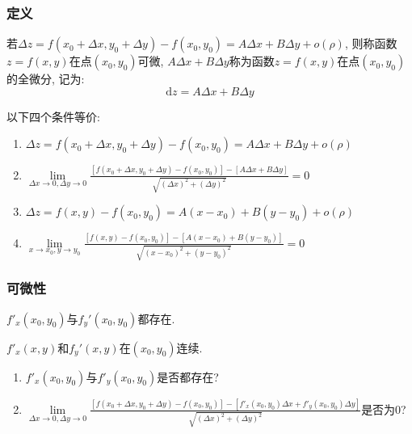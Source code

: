 \subsubsection{定义}
若$ \Delta z=f(x_{0}+\Delta x,y_{0}+\Delta y)-f(x_{0},y_{0})=A\Delta x+B\Delta y+o(\rho) $, 则称函数$ z=f(x,y) $在点$ (x_{0},y_{0}) $可微, $ A\Delta x+B\Delta y $称为函数$ z=f(x,y) $在点$ (x_{0},y_{0}) $的全微分, 记为:
\begin{equation*}
    \mathrm{d}z=A\Delta x+B\Delta y
\end{equation*}
\begin{tcolorbox}
    以下四个条件等价:
    \begin{enumerate}
        \item $ \Delta z=f(x_{0}+\Delta x,y_{0}+\Delta y)-f(x_{0},y_{0})=A\Delta x+B\Delta y+o(\rho) $
        \item $ \lim\limits_{\Delta x \rightarrow 0, \Delta y\rightarrow 0}\frac{[f(x_{0}+\Delta x,y_{0}+\Delta y)-f(x_{0},y_{0})]-[A\Delta x+B\Delta y]}{\sqrt{(\Delta x)^{2}+(\Delta y)^{2}}}=0 $
        \item $ \Delta z=f(x,y)-f(x_{0},y_{0})=A(x-x_{0})+B(y-y_{0})+o(\rho) $
        \item $ \lim\limits_{x \rightarrow x_{0}, y\rightarrow y_{0}}\frac{[f(x,y)-f(x_{0},y_{0})]-[A(x-x_{0})+B(y-y_{0})]}{\sqrt{(x-x_{0})^{2}+(y-y_{0})^{2}}}=0 $
    \end{enumerate}
\end{tcolorbox}
\subsubsection{可微性}
\par \vspace{.5em}
$ f'_{x}(x_{0},y_{0}) $与$ f_{y}'(x_{0},y_{0}) $都存在.\par \vspace{.5em}
\par \vspace{.5em}
$ f'_{x}(x,y) $和$ f_{y}'(x,y) $在$ (x_{0},y_{0}) $连续.\par \vspace{.5em}
\par \vspace{.5em}
\begin{enumerate}
    \item $ f'_{x}(x_{0},y_{0}) $与$ f'_{y}(x_{0},y_{0}) $是否都存在?
    \item $ \lim\limits_{\Delta x \rightarrow 0, \Delta y\rightarrow 0}\frac{[f(x_{0}+\Delta x,y_{0}+\Delta y)-f(x_{0},y_{0})]-[f'_{x}(x_{0},y_{0})\Delta x+f'_{y}(x_{0},y_{0})\Delta y]}{\sqrt{(\Delta x)^{2}+(\Delta y)^{2}}} $是否为0?
\end{enumerate}
